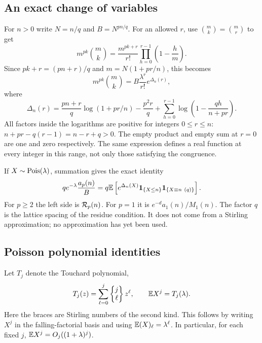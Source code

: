 \subsection{An exact change of variables}
For $n>0$ write $N=n/q$ and $B=N^{pn/q}$.
For an allowed $r$, use $\binom mk=\binom mr$ to get
\[
 m^{pk}\binom mk
  =\frac{m^{pk+r}}{r!}\prod_{h=0}^{r-1}\left(1-\frac hm\right).
\]
Since $pk+r=(pn+r)/q$ and $m=N(1+pr/n)$, this becomes
\begin{equation}\label{spb:ep:eq:exactterm}
 m^{pk}\binom mk=B\frac{\lambda^r}{r!}e^{\Delta_n(r)},
\end{equation}
where
\begin{equation}\label{spb:ep:eq:Delta}
 \Delta_n(r)=\frac{pn+r}{q}\log(1+pr/n)-\frac{p^2r}{q}
      +\sum_{h=0}^{r-1}\log\left(1-\frac{qh}{n+pr}\right).
\end{equation}
All factors inside the logarithms are positive for integers $0\le r\le n$:
$n+pr-q(r-1)=n-r+q>0$.
The empty product and empty sum at $r=0$ are one and zero respectively.
The same expression defines a real function at every integer in this range,
not only those satisfying the congruence.

If $X\sim\operatorname{Pois}(\lambda)$, summation gives the exact identity
\begin{equation}\label{spb:ep:eq:exactpoisson}
 q e^{-\lambda}\frac{a_p(n)}{B}
  =q\mathbb E\left[e^{\Delta_n(X)}\mathbf 1_{\{X\le n\}}
                    \mathbf 1_{\{X\equiv n\ (q)\}}\right].
\end{equation}
For $p\ge2$ the left side is $\mathcal R_p(n)$.
For $p=1$ it is $e^{-d}a_1(n)/M_1(n)$.
The factor $q$ is the lattice spacing of the residue condition. It does
not come from a Stirling approximation; no approximation has yet been used.

\subsection{Poisson polynomial identities}
Let $T_j$ denote the Touchard polynomial,
\begin{equation}\label{spb:ep:eq:touchard}
 T_j(z)=\sum_{\ell=0}^j\left\{\begin{matrix}j\\\ell\end{matrix}\right\}z^\ell,
 \qquad \mathbb E X^j=T_j(\lambda).
\end{equation}
Here the braces are Stirling numbers of the second kind.
This follows by writing $X^j$ in the falling-factorial basis and using
$\mathbb E(X)_\ell=\lambda^\ell$.
In particular, for each fixed $j$,
$\mathbb E X^j=O_j((1+\lambda)^j)$.

